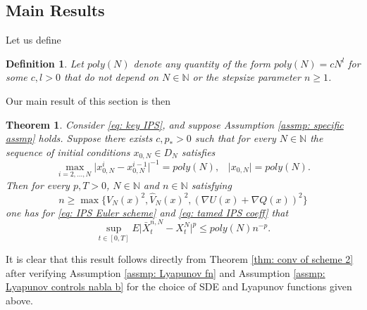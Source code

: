 \documentclass{article}
\newtheorem{thm}{Theorem}
\newtheorem{defn}{Definition}
\begin{document}
\subsection{Main Results}
Let us define
 \begin{defn}
        Let $\textit{poly}(N)$ denote any quantity of the form $\textit{poly}(N)=cN^{l}$ for some $c,l>0$ that do not depend on $N\in \mathbb{N}$ or the stepsize parameter $n\geq 1$.
    \end{defn}   
    Our main result of this section is then
\begin{thm}\label{thm: conv of particle Euler scheme}
    Consider \eqref{eq: key IPS}, and suppose Assumption \ref{assmp: specific assmp} holds. Suppose there exists $c,p_*>0$ such that for every $N\in \mathbb{N}$ the sequence of initial conditions $x_{0,N}\in D_N$ satisfies
    \begin{equation}
        \max_{i=2,...,N}\lvert x_{0,N}^i-x^{i-1}_{0,N}\rvert^{-1}=\textit{poly}(N),\;\;\;\lvert x_{0,N}\rvert =poly(N).
    \end{equation}
    Then for every $p,T>0$, $N\in \mathbb{N}$ and $n\in \mathbb{N}$ satisfying 
    \begin{equation}
    n\geq \max\{V_N(x)^2, \hat{V}_N(x)^2,(\nabla U(x)+\nabla Q(x))^2\}
    \end{equation}
    one has for \eqref{eq: IPS Euler scheme} and \eqref{eq: tamed IPS coeff} that
     \begin{equation}
       \sup_{t\in [0,T]}E\lvert \bar{X}^{n,N}_t-X^N_t\rvert^p\leq \textit{poly}(N)n^{-p}.
    \end{equation}
\end{thm}

It is clear that this result follows directly from Theorem \ref{thm: conv of scheme 2} after verifying Assumption \ref{assmp: Lyapunov fn} and Assumption \ref{assmp: Lyapunov controls nabla b} for the choice of SDE and Lyapunov functions given above.
\end{document}
